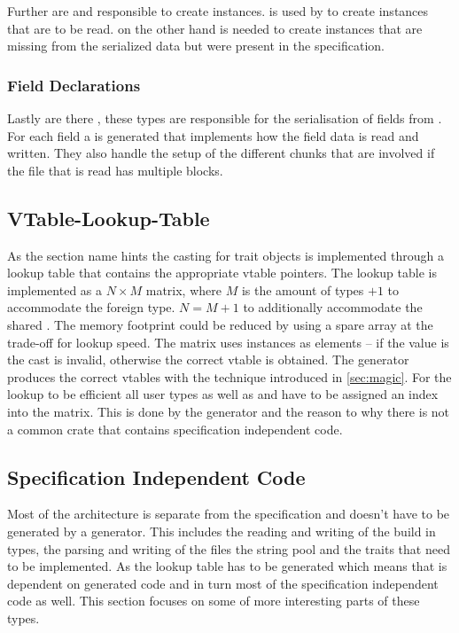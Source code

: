 \documentclass[thesis]{subfiles}
\begin{document}
      Further are \PoolProxy and \PartsMaker responsible to create \UserFieldDeclaration instances.
      \PartsMaker is used by \Pool to create \UserFieldDeclaration instances that are to be read.
      \PoolProxy on the other hand is needed to create \UserFieldDeclaration instances that are missing from the serialized data but were present in the specification.

    \subsubsection{Field Declarations}
      Lastly are there \FieldDeclarations, these types are responsible for the serialisation of fields from \UserTypes.
      For each field a \FieldDeclaration is generated that implements how the field data is read and written.
      They also handle the setup of the different chunks that are involved if the file that is read has multiple blocks.

  \subsection{VTable-Lookup-Table}
    As the section name hints the casting for trait objects is implemented through a lookup table that contains the appropriate vtable pointers.
    The lookup table is implemented as a $N \times M$ matrix, where $M$ is the amount of types $+1$ to accommodate the foreign type.
    $N=M+1$ to additionally accommodate the shared \trait \SkillObject.
    The memory footprint could be reduced by using a spare array at the trade-off for lookup speed.
    The matrix uses  instances as elements -- if the value is  the cast is invalid, otherwise the correct vtable is obtained.
    The generator produces the correct vtables with the technique introduced in \autoref{sec:magic}.
    For the lookup to be efficient all user types as well as  and \SkillObject have to be assigned an index into the matrix.
    This is done by the generator and the reason to why there is not a common crate that contains specification independent code.

  \subsection{Specification Independent Code}
    Most of the architecture is separate from the specification and doesn't have to be generated by a generator.
    This includes the reading and writing of the build in types, the parsing and writing of the files the string pool and the traits that need to be implemented.
    As the lookup table has to be generated which means that \PtrT is dependent on generated code and in turn most of the specification independent code as well.
    This section focuses on some of more interesting parts of these types.
\end{document}
